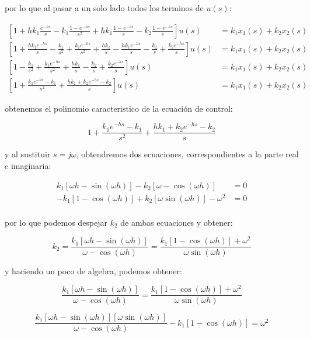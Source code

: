 \documentclass{article}
\begin{document}
por lo que al pasar a un solo lado todos los terminos de \(u(s)\):

\[
\begin{align}
\left[ 1 + h k_1 \frac{e^{-hs}}{s} - k_1 \frac{1 - e^{-hs}}{s^2} + h k_1 \frac{1 - e^{-hs}}{s} - k_2 \frac{1 - e^{-hs}}{s} \right] u(s) &= k_1 x_1(s) + k_2 x_2(s) \\
\left[ 1 + \frac{h k_1 e^{-hs}}{s} - \frac{k_1}{s^2} + \frac{k_1 e^{-hs}}{s^2} + \frac{h k_1}{s} - \frac{h k_1 e^{-hs}}{s} - \frac{k_2}{s} + \frac{k_2 e^{-hs}}{s} \right] u(s) &= k_1 x_1(s) + k_2 x_2(s) \\
\left[ 1  - \frac{k_1}{s^2} + \frac{k_1 e^{-hs}}{s^2} + \frac{h k_1}{s} - \frac{k_2}{s} + \frac{k_2 e^{-hs}}{s} \right] u(s) &= k_1 x_1(s) + k_2 x_2(s) \\
\left[ 1  + \frac{k_1 e^{-hs} - k_1}{s^2} + \frac{h k_1 + k_2 e^{-hs} - k_2}{s} \right] u(s) &= k_1 x_1(s) + k_2 x_2(s)
\end{align}
\]

obtenemos el polinomio caracteristico de la ecuación de control:

\[
1  + \frac{k_1 e^{-hs} - k_1}{s^2} + \frac{h k_1 + k_2 e^{-hs} - k_2}{s}
\]

y al sustituir \(s = j \omega\), obtendremos dos ecuaciones,
correspondientes a la parte real e imaginaria:

\[
\begin{align}
k_1 \left[ \omega h - \sin{(\omega h)} \right] - k_2 \left[ \omega - \cos{(\omega h)} \right] &= 0 \\
- k_1 \left[ 1 - \cos{(\omega h)} \right] + k_2 \left[ \omega \sin{(\omega h)} \right] - \omega^2 &= 0 \\
\end{align}
\]

por lo que podemos despejar \(k_2\) de ambas ecuaciones y obtener:

\[
k_2 = \frac{k_1 \left[ \omega h - \sin{(\omega h)} \right]}{\omega - \cos{(\omega h)}} = \frac{k_1 \left[ 1 - \cos{(\omega h)} \right] + \omega^2}{\omega \sin{(\omega h)}}
\]

y haciendo un poco de algebra, podemos obtener:

\[
\frac{k_1 \left[ \omega h - \sin{(\omega h)} \right]}{\omega - \cos{(\omega h)}} = \frac{k_1 \left[ 1 - \cos{(\omega h)} \right] + \omega^2}{\omega \sin{(\omega h)}}
\]

\[
\frac{k_1 \left[ \omega h - \sin{(\omega h)} \right] \left[ \omega \sin{(\omega h)} \right]}{\omega - \cos{(\omega h)}} - k_1 \left[ 1 - \cos{(\omega h)} \right] = \omega^2
\]
\end{document}
